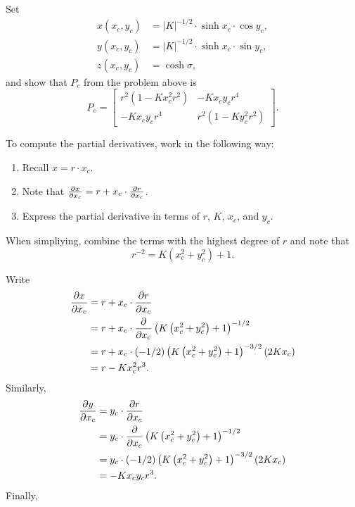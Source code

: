 \documentclass{ximera}
\begin{document}
\begin{problem}
  Set
  \begin{align*}
    x(x_c,y_c) &=|K|^{-1/2}\cdot \sinh x_c\cdot \cos y_c,\\
    y(x_c,y_c) &=|K|^{-1/2}\cdot \sinh x_c\cdot \sin y_c,\\
    z(x_c,y_c) &=\cosh\sigma,
  \end{align*}
  and show that $P_c$ from the problem above is
  \[
P_c = \begin{bmatrix}
r^{2}\left(  1-Kx_{c}^{2}r^2\right)  & -Kx_{c}y_{c}r^4\\
-Kx_{c}y_{c}r^4 & r^{2}\left(  1-Ky_{c}^{2}r^2\right)
\end{bmatrix}.
\]
\begin{hint}
  To compute the partial derivatives, work in the following way:
  \begin{enumerate}
  \item Recall $x = r\cdot x_c$.
  \item Note that $\pp[x]{x_c} = r + x_c \cdot \pp[r]{x_c}$.
    \item Express the partial derivative in terms of $r$, $K$, $x_c$,
      and $y_c$.
  \end{enumerate}
\end{hint}
\begin{hint}
  When simpliying, combine the terms with the highest degree of $r$
  and note that
  \[
  r^{-2} = K\left(x_c^2 + y_c^2\right) + 1.
  \]
\end{hint}
\begin{freeResponse}
  Write
  \begin{align*}
    \pp[x]{x_c} &= r  + x_c \cdot \pp[r]{x_c}\\
    &= r + x_c \cdot \pp{x_c} \left(K\left(x_c^2 + y_c^2\right)+1\right)^{-1/2}\\
    &= r + x_c \cdot (-1/2)\left(K\left(x_c^2 + y_c^2\right)+1\right)^{-3/2}(2Kx_c)\\
    &= r -Kx_c^2 r^3.
  \end{align*}
  Similarly,
    \begin{align*}
    \pp[y]{x_c} &= y_c \cdot \pp[r]{x_c}\\
    &= y_c \cdot \pp{x_c} \left(K\left(x_c^2 + y_c^2\right)+1\right)^{-1/2}\\
    &= y_c \cdot (-1/2)\left(K\left(x_c^2 + y_c^2\right)+1\right)^{-3/2}(2Kx_c)\\
    &= -Kx_cy_c r^3.
    \end{align*}
   Finally, 
    \begin{align*}

\end{align*}
\end{freeResponse}
\end{problem}
\end{document}
